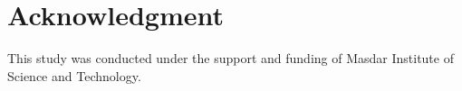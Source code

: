 \documentclass[conference]{IEEEtran}
\begin{document}
\section*{Acknowledgment}

This study was conducted under the support and funding of Masdar Institute of Science and Technology.

\end{document}
